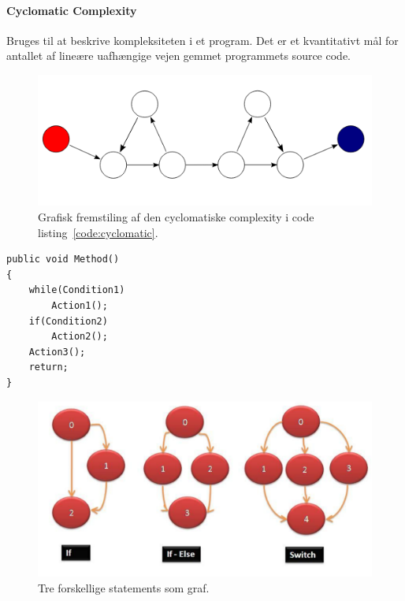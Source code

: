 \paragraph{Cyclomatic Complexity}\label{sec:cyclomatic}
Bruges til at beskrive kompleksiteten i et program. Det er et kvantitativt mål for antallet af lineære uafhængige vejen gemmet programmets source code.

%
%
%
%

\begin{figure}[H]
	\centering
	\includegraphics[width=0.8\linewidth]{figs/cyclomatic}
	\caption{Grafisk fremstiling af den cyclomatiske complexity i code listing~\ref{code:cyclomatic}.}
	\label{fig:cyclomatic}
\end{figure}

\begin{lstlisting}[caption=Kode for eksempel vist på figur~\ref{fig:cyclomatic}.,label=code:cyclomatic]
public void Method()
{
	while(Condition1) 
		Action1();		
	if(Condition2) 
		Action2();		
	Action3();	
	return;
}
\end{lstlisting}

\begin{figure}[H]
\centering
\includegraphics[width=0.8\linewidth]{figs/statementsgraph}
\caption{Tre forskellige statements som graf.}
\label{fig:statementsgraph}
\end{figure}


